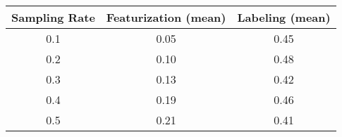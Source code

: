\begin{tabular}{ccc}
\toprule
 Sampling Rate &  Featurization (mean) &  Labeling (mean) \\
\midrule
           0.1 &                  0.05 &             0.45 \\
           0.2 &                  0.10 &             0.48 \\
           0.3 &                  0.13 &             0.42 \\
           0.4 &                  0.19 &             0.46 \\
           0.5 &                  0.21 &             0.41 \\
\bottomrule
\end{tabular}
